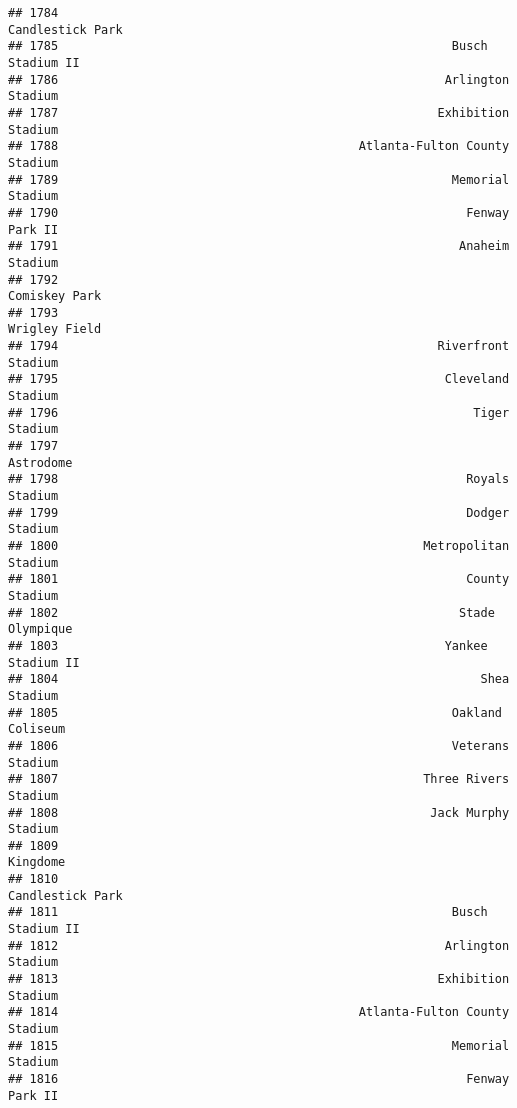 \documentclass[]{article}
\begin{document}
\begin{verbatim}
## 1784                                                       Candlestick Park
## 1785                                                       Busch Stadium II
## 1786                                                      Arlington Stadium
## 1787                                                     Exhibition Stadium
## 1788                                          Atlanta-Fulton County Stadium
## 1789                                                       Memorial Stadium
## 1790                                                         Fenway Park II
## 1791                                                        Anaheim Stadium
## 1792                                                          Comiskey Park
## 1793                                                          Wrigley Field
## 1794                                                     Riverfront Stadium
## 1795                                                      Cleveland Stadium
## 1796                                                          Tiger Stadium
## 1797                                                              Astrodome
## 1798                                                         Royals Stadium
## 1799                                                         Dodger Stadium
## 1800                                                   Metropolitan Stadium
## 1801                                                         County Stadium
## 1802                                                        Stade Olympique
## 1803                                                      Yankee Stadium II
## 1804                                                           Shea Stadium
## 1805                                                       Oakland Coliseum
## 1806                                                       Veterans Stadium
## 1807                                                   Three Rivers Stadium
## 1808                                                    Jack Murphy Stadium
## 1809                                                               Kingdome
## 1810                                                       Candlestick Park
## 1811                                                       Busch Stadium II
## 1812                                                      Arlington Stadium
## 1813                                                     Exhibition Stadium
## 1814                                          Atlanta-Fulton County Stadium
## 1815                                                       Memorial Stadium
## 1816                                                         Fenway Park II

\end{verbatim}
\end{document}
